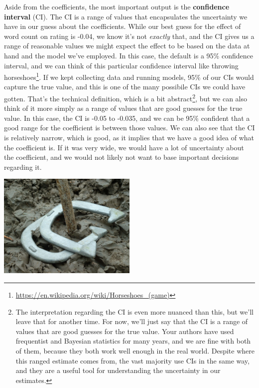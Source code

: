 \documentclass[
  letterpaper,
]{krantz}
\DeclareRobustCommand{\href}[2]{#2\footnote{\url{#1}}}
\begin{document}
Aside from the coefficients, the most important output is the
\textbf{confidence interval} (CI). The CI is a range of values that
encapsulates the uncertainty we have in our guess about the
coefficients. While our best guess for the effect of word count on
rating is -0.04, we know it's not \emph{exactly} that, and the CI gives
us a range of reasonable values we might expect the effect to be based
on the data at hand and the model we've employed. In this case, the
default is a 95\% confidence interval, and we can think of this
particular confidence interval like
\href{https://en.wikipedia.org/wiki/Horseshoes_(game)}{throwing
horseshoes}. If we kept collecting data and running models, 95\% of our
CIs would capture the true value, and this is one of the many possibile
CIs we could have gotten. That's the technical definition, which is a
bit abstract\footnote{The interpretation regarding the CI is even more
  nuanced than this, but we'll leave that for another time. For now,
  we'll just say that the CI is a range of values that are good guesses
  for the true value. Your authors have used frequentist and Bayesian
  statistics for many years, and we are fine with both of them, because
  they both work well enough in the real world. Despite where this
  ranged estimate comes from, the vast majority use CIs in the same way,
  and they are a useful tool for understanding the uncertainty in our
  estimates.}, but we can also think of it more simply as a range of
values that are good guesses for the true value. In this case, the CI is
-0.05 to -0.035, and we can be 95\% confident that a good range for the
coefficient is between those values. We can also see that the CI is
relatively narrow, which is good, as it implies that we have a good idea
of what the coefficient is. If it was very wide, we would have a lot of
uncertainty about the coefficient, and we would not likely not want to
base important decisions regarding it.

\includegraphics[width=0.5\textwidth,height=\textheight]{img/horseshoes.jpeg}
\end{document}

